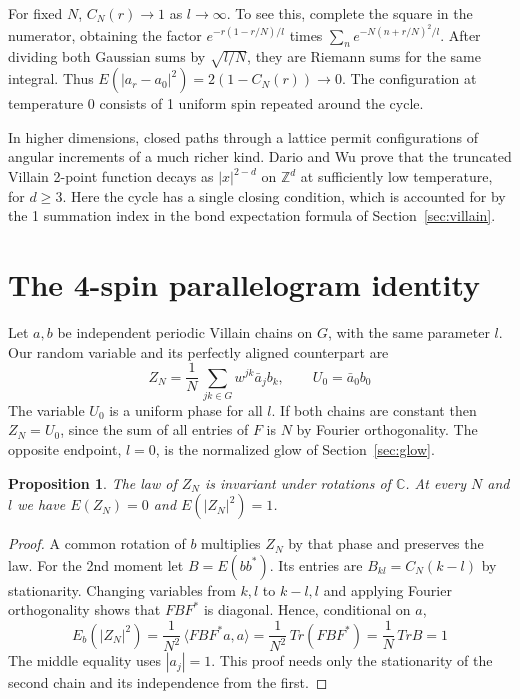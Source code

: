 \documentclass[11pt,a4paper]{article}
\newtheorem{prop}[thm]{Proposition}
\theoremstyle{remark}
\begin{document}
For fixed $N$, $C_N(r)\to1$ as $l\to\infty$. To see this, complete
the square in the numerator, obtaining the factor
$e^{-r(1-r/N)/l}$ times $\sum_n e^{-N(n+r/N)^2/l}$.
After dividing both Gaussian sums by $\sqrt{l/N}$, they are Riemann
sums for the same integral. Thus $E(|a_r-a_0|^2)=2(1-C_N(r))\to0$.
The configuration at temperature 0 consists of 1 uniform spin repeated
around the cycle.

In higher dimensions, closed paths through a lattice permit configurations
of angular increments of a much richer kind. Dario and Wu \cite{dariowu}
prove that the truncated Villain 2-point function decays as $|x|^{2-d}$ on $\mathbb Z^d$ at sufficiently low temperature, for $d\geq3$. Here the cycle has a single closing
condition, which is accounted for by the 1 summation index in
the bond expectation formula of Section~\ref{sec:villain}.

\section{The 4-spin parallelogram identity}\label{sec:two}\label{sec:four}

Let $a,b$ be independent periodic Villain chains on $G$, with the same
parameter $l$. Our random variable and its perfectly aligned counterpart are
\[
  Z_N=\frac1N\,\sum_{jk\in G}w^{jk}\bar a_jb_k,\qquad
  U_0=\bar a_0 b_0
\]
The variable $U_0$ is a uniform phase for all $l$. If both chains are
constant then $Z_N=U_0$, since the sum of all entries of $F$ is $N$ by
Fourier orthogonality. The opposite endpoint, $l=0$, is the normalized
glow of Section~\ref{sec:glow}.

\begin{samepage}
\begin{prop}\label{prop:two}
The law of $Z_N$ is invariant under rotations of $\mathbb C$. At every $N$ and
$l$ we have $E(Z_N)=0$ and $E(|Z_N|^2)=1$.
\end{prop}
\end{samepage}
\begin{proof}
A common rotation of $b$ multiplies $Z_N$ by that phase and preserves the
law. For the 2nd moment let $B=E(bb^*)$. Its entries are
$B_{kl}=C_N(k-l)$ by stationarity. Changing variables from $k,l$ to
$k-l,l$ and applying Fourier orthogonality shows that $FBF^*$ is diagonal.
Hence, conditional on $a$,
\[
  E_b(|Z_N|^2)=\frac1{N^2}\,\langle FBF^*a,a\rangle
   =\frac1{N^2}\,Tr(FBF^*)=\frac1N\,Tr B=1
\]
The middle equality uses $|a_j|=1$. This proof needs only the stationarity
of the second chain and its independence from the first.
\end{proof}
\end{document}
